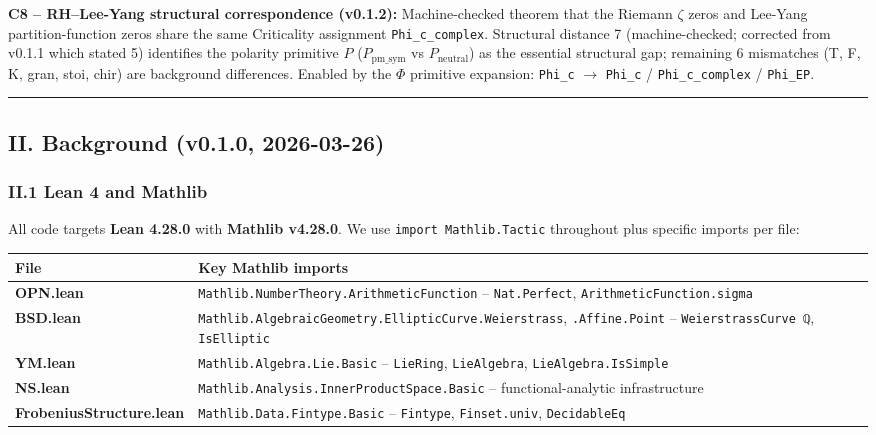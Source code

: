 \documentclass[12pt,a4paper]{article}
\begin{document}
\textbf{C8  --  RH--Lee-Yang structural correspondence (v0.1.2):} Machine-checked theorem that the Riemann $\zeta$ zeros and Lee-Yang partition-function zeros share the same Criticality assignment \texttt{Phi\_c\_complex}. Structural distance 7 (machine-checked; corrected from v0.1.1 which stated 5) identifies the polarity primitive $P$ ($P_\text{pm\_sym}$ vs $P_\text{neutral}$) as the essential structural gap; remaining 6 mismatches (T, F, K, gran, stoi, chir) are background differences. Enabled by the $\Phi$ primitive expansion: \texttt{Phi\_c} $\rightarrow$ \texttt{Phi\_c} / \texttt{Phi\_c\_complex} / \texttt{Phi\_EP}.

\begin{center}
\rule{0.5\textwidth}{0.4pt}
\end{center}

\subsection{II. Background (v0.1.0, 2026-03-26)}

\subsubsection{II.1 Lean 4 and Mathlib}

All code targets \textbf{Lean 4.28.0} with \textbf{Mathlib v4.28.0}. We use \texttt{import Mathlib.Tactic} throughout plus specific imports per file:

\begin{table}[htbp]
\centering
\small
{}
\begin{tabularx}{\textwidth}{>{\centering\arraybackslash}X >{\centering\arraybackslash}X}
\toprule
\rowcolor{gray!25}\textbf{File} & \textbf{Key Mathlib imports} \\
\midrule
\rowcolors{1}{white}{gray!10}
\textbf{OPN.lean} & \texttt{Mathlib.NumberTheory.ArithmeticFunction}  --  \texttt{Nat.Perfect}, \texttt{ArithmeticFunction.sigma} \\
\textbf{BSD.lean} & \texttt{Mathlib.AlgebraicGeometry.EllipticCurve.Weierstrass}, \texttt{.Affine.Point}  --  \texttt{WeierstrassCurve ℚ}, \texttt{IsElliptic} \\
\textbf{YM.lean} & \texttt{Mathlib.Algebra.Lie.Basic}  --  \texttt{LieRing}, \texttt{LieAlgebra}, \texttt{LieAlgebra.IsSimple} \\
\textbf{NS.lean} & \texttt{Mathlib.Analysis.InnerProductSpace.Basic}  --  functional-analytic infrastructure \\
\textbf{FrobeniusStructure.lean} & \texttt{Mathlib.Data.Fintype.Basic}  --  \texttt{Fintype}, \texttt{Finset.univ}, \texttt{DecidableEq} \\
\bottomrule
\end{tabularx}
\end{table}
\end{document}
